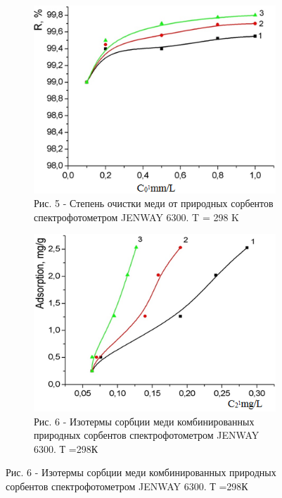 \begin{figure}[H]
    \centering
    \begin{subfigure}[t]{0.45\textwidth} %
        \centering
        \includegraphics[width=\textwidth]{media/chem/image6}
        \caption*{Рис. 5 - Степень очистки меди от природных сорбентов
спектрофотометром JENWAY 6300. T = 298 K}
    \end{subfigure}
    \hspace{0.05\textwidth} %
    \begin{subfigure}[t]{0.45\textwidth} %
        \centering
        \includegraphics[width=\textwidth]{media/chem/image7}
        \caption*{Рис. 6 - Изотермы сорбции меди комбинированных природных
сорбентов спектрофотометром JENWAY 6300. Т =298К}
    \end{subfigure}
\end{figure}

